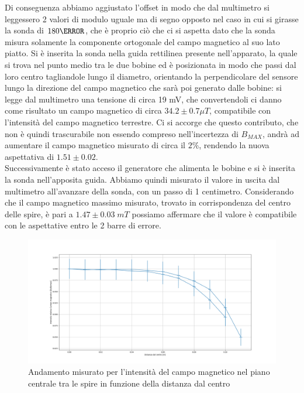 \documentclass[10pt, a4paper, italian]{article}
\begin{document}
Di conseguenza abbiamo aggiustato l'offset in modo che dal multimetro si leggessero 2 valori di modulo uguale ma di segno opposto nel caso in cui si girasse la sonda di $180 \degree$, che è proprio ciò che ci si aspetta dato che la sonda misura solamente la componente ortogonale del campo magnetico al suo lato piatto.
Si è inserita la sonda nella guida rettilinea presente nell'apparato, la quale si trova nel punto medio tra le due bobine ed è posizionata in modo che passi dal loro centro tagliandole lungo il diametro, orientando la perpendicolare del sensore lungo la direzione del campo magnetico che sarà poi generato dalle bobine: si legge dal multimetro una tensione di circa 19 mV, che convertendoli ci danno come risultato un campo magnetico di circa $34.2 \pm 0.7 \mu T$, compatibile con l'intensità del campo magnetico terrestre. Ci si accorge che questo contributo, che non è quindi trascurabile non essendo compreso nell'incertezza di $B_{MAX}$, andrà ad aumentare il campo magnetico misurato di circa il $2 \percent$, rendendo la nuova aspettativa di $1.51 \pm 0.02$.\\
Successivamente è stato acceso il generatore che alimenta le bobine e si è inserita la sonda nell'apposita guida. Abbiamo quindi misurato il valore in uscita dal multimetro all'avanzare della sonda, con un passo di 1 centimetro.
Considerando che il campo magnetico massimo misurato, trovato in corrispondenza del centro delle spire, è pari a $1.47 \pm 0.03 \;mT$ possiamo affermare che il valore è compatibile con le aspettative entro le 2 barre di errore.
\begin{figure}
\includegraphics[width=\textwidth]{sounasegaiochiamalocomecazzotiparetantocifounasegaio}
\caption{Andamento misurato per l'intensità del campo magnetico nel piano centrale tra le spire in funzione della distanza dal centro}
\end{figure}
\end{document}
